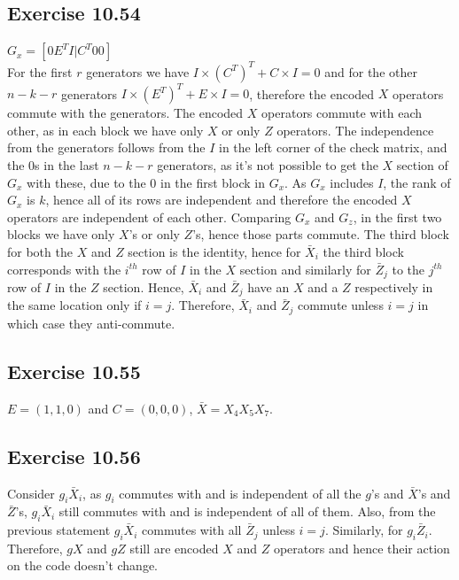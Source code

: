 \documentclass[a4paper,12pt]{article}
\begin{document}
\subsection*{Exercise 10.54}
$G_x=[0E^TI|C^T00]$\\
For the first $r$ generators we have $I\times (C^T)^T+C\times I=0$ and for
the other $n-k-r$ generators $I\times (E^T)^T+E\times I=0$, therefore the encoded $X$
operators commute with the generators. The encoded $X$ operators commute with each other,
as in each block we have only $X$ or only $Z$ operators. The independence from the generators
follows from the $I$ in the left corner of the check matrix, and the $0$s in the last
$n-k-r$ generators, as it's not possible to get the $X$ section of $G_x$ with these, due to
the $0$ in the first block in $G_x$. As $G_x$ includes $I$, the rank of $G_x$ is $k$, 
hence all of its rows are independent and
therefore the encoded $X$ operators are independent of each other.
Comparing $G_x$ and $G_z$, in the first two blocks we have only $X$'s or only $Z$'s, hence
those parts commute. The third block for both the $X$ and $Z$ section is the identity, hence for
$\bar{X}_i$ the third block corresponds with the $i^{th}$ row of $I$ in the $X$ section and
similarly for $\bar{Z}_j$ to the $j^{th}$ row of $I$ in the $Z$ section. Hence, $\bar{X}_i$
and $\bar{Z}_j$ have an $X$ and a $Z$ respectively in the same location only if $i=j$. Therefore,
$\bar{X}_i$ and $\bar{Z}_j$ commute unless $i=j$ in which case they anti-commute.
\subsection*{Exercise 10.55}
$E=(1,1,0)$ and $C=(0,0,0)$, $\bar{X}=X_4X_5X_7$.
\subsection*{Exercise 10.56}
Consider $g_i\bar{X}_i$, as $g_i$ commutes with and is independent of all the 
$g$'s and $\bar{X}$'s and $\bar{Z}$'s,
$g_i\bar{X}_i$ still commutes with and is independent of all of them. Also, from the previous
statement $g_i\bar{X}_i$ commutes with all $\bar{Z}_j$ unless $i=j$. Similarly, for 
$g_i\bar{Z}_i$. Therefore, $gX$ and $gZ$ still are encoded $X$ and $Z$ operators and hence
their action on the code doesn't change.
\end{document}
